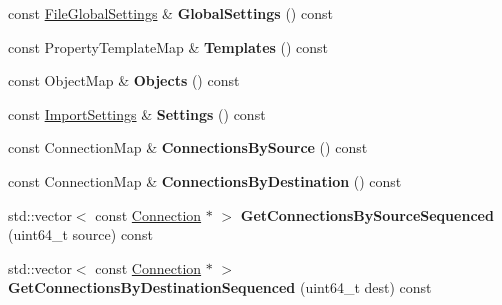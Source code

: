 \begin{DoxyCompactItemize}
\item 
\hypertarget{class_assimp_1_1_f_b_x_1_1_document_ad699c3c3cdd7da440f91539af6617ca9}{const \hyperlink{class_assimp_1_1_f_b_x_1_1_file_global_settings}{File\+Global\+Settings} \& {\bfseries Global\+Settings} () const }\label{class_assimp_1_1_f_b_x_1_1_document_ad699c3c3cdd7da440f91539af6617ca9}

\item 
\hypertarget{class_assimp_1_1_f_b_x_1_1_document_a292b4ccec10dfe285849486b8b5652f4}{const Property\+Template\+Map \& {\bfseries Templates} () const }\label{class_assimp_1_1_f_b_x_1_1_document_a292b4ccec10dfe285849486b8b5652f4}

\item 
\hypertarget{class_assimp_1_1_f_b_x_1_1_document_a2e33576c6582eb8ae710e02038cf348e}{const Object\+Map \& {\bfseries Objects} () const }\label{class_assimp_1_1_f_b_x_1_1_document_a2e33576c6582eb8ae710e02038cf348e}

\item 
\hypertarget{class_assimp_1_1_f_b_x_1_1_document_a528d2afdfc09341d84ddac56c3c676df}{const \hyperlink{struct_assimp_1_1_f_b_x_1_1_import_settings}{Import\+Settings} \& {\bfseries Settings} () const }\label{class_assimp_1_1_f_b_x_1_1_document_a528d2afdfc09341d84ddac56c3c676df}

\item 
\hypertarget{class_assimp_1_1_f_b_x_1_1_document_a6973bf436107676315eb54c36b85be86}{const Connection\+Map \& {\bfseries Connections\+By\+Source} () const }\label{class_assimp_1_1_f_b_x_1_1_document_a6973bf436107676315eb54c36b85be86}

\item 
\hypertarget{class_assimp_1_1_f_b_x_1_1_document_aa26dd0008a86e3d59bf6ddd173fb42d9}{const Connection\+Map \& {\bfseries Connections\+By\+Destination} () const }\label{class_assimp_1_1_f_b_x_1_1_document_aa26dd0008a86e3d59bf6ddd173fb42d9}

\item 
\hypertarget{class_assimp_1_1_f_b_x_1_1_document_a07945f68b3c301a0bd3f240f898bdd31}{std\+::vector$<$ const \hyperlink{class_assimp_1_1_f_b_x_1_1_connection}{Connection} $\ast$ $>$ {\bfseries Get\+Connections\+By\+Source\+Sequenced} (uint64\+\_\+t source) const }\label{class_assimp_1_1_f_b_x_1_1_document_a07945f68b3c301a0bd3f240f898bdd31}

\item 
\hypertarget{class_assimp_1_1_f_b_x_1_1_document_ad0c2bcdf4be71945abf7b303e62840a1}{std\+::vector$<$ const \hyperlink{class_assimp_1_1_f_b_x_1_1_connection}{Connection} $\ast$ $>$ {\bfseries Get\+Connections\+By\+Destination\+Sequenced} (uint64\+\_\+t dest) const }\label{class_assimp_1_1_f_b_x_1_1_document_ad0c2bcdf4be71945abf7b303e62840a1}


\end{DoxyCompactItemize}

